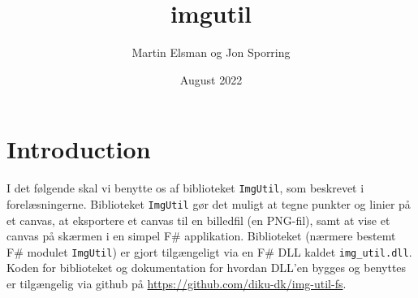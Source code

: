 \documentclass{article}
\title{imgutil}
\author{Martin Elsman og Jon Sporring}
\date{August 2022}
\begin{document}
\maketitle

\section{Introduction}
I det følgende skal vi benytte os af biblioteket \texttt{ImgUtil}, som
beskrevet i forelæsningerne. Biblioteket \texttt{ImgUtil} gør det
muligt at tegne punkter og linier på et canvas, at eksportere et
canvas til en billedfil (en PNG-fil), samt at vise et canvas på
skærmen i en simpel F\# applikation. Biblioteket (nærmere bestemt F\#
modulet \texttt{ImgUtil}) er gjort tilgængeligt via en F\# DLL kaldet
\texttt{img\_util.dll}. Koden for biblioteket og dokumentation for
hvordan DLL'en bygges og benyttes er tilgængelig via github på
\url{https://github.com/diku-dk/img-util-fs}.
\end{document}
